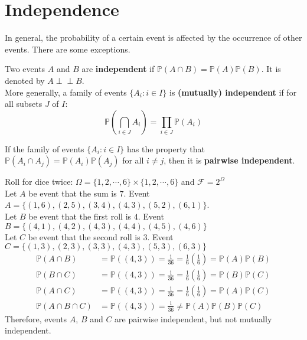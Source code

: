 \documentclass{huhtakm-template-book}
\newcommand{\independent}{\perp\!\!\!\perp}
\newcommand{\prob}{\mathbb{P}}
\begin{document}
\section{Independence}
    In general, the probability of a certain event is affected by the occurrence of other events. There are some exceptions.
    \begin{defn} %
        Two events $A$ and $B$ are \textbf{independent} if $\prob(A\cap B)=\prob(A)\prob(B)$. It is denoted by $A\independent B$.\\
        More generally, a family of events $\{A_{i}:i\in I\}$ is \textbf{(mutually) independent} if for all subsets $J$ of $I$:
        \begin{equation*}
            \prob\left(\bigcap_{i\in J}A_{i}\right)=\prod_{i\in J}\prob(A_{i})
        \end{equation*}
    \end{defn}
    \begin{rem}
        If the family of events $\{A_{i}:i\in I\}$ has the property that $\prob(A_{i}\cap A_{j})=\prob(A_{i})\prob(A_{j})$ for all $i\neq j$, then it is \textbf{pairwise independent}.
    \end{rem}
    \begin{eg}
        Roll for dice twice: $\Omega=\{1,2,\cdots,6\}\times\{1,2,\cdots,6\}$ and $\mathcal{F}=2^{\Omega}$\\
        Let $A$ be event that the sum is $7$. Event $A=\{(1,6),(2,5),(3,4),(4,3),(5,2),(6,1)\}$.\\
        Let $B$ be event that the first roll is $4$. Event $B=\{(4,1),(4,2),(4,3),(4,4),(4,5),(4,6)\}$\\
        Let $C$ be event that the second roll is $3$. Event $C=\{(1,3),(2,3),(3,3),(4,3),(5,3),(6,3)\}$
        \begin{align*}
            \prob(A\cap B)&=\prob((4,3))=\frac{1}{36}=\frac{1}{6}\left(\frac{1}{6}\right)=\prob(A)\prob(B)\\
            \prob(B\cap C)&=\prob((4,3))=\frac{1}{36}=\frac{1}{6}\left(\frac{1}{6}\right)=\prob(B)\prob(C)\\
            \prob(A\cap C)&=\prob((4,3))=\frac{1}{36}=\frac{1}{6}\left(\frac{1}{6}\right)=\prob(A)\prob(C)\\
            \prob(A\cap B\cap C)&=\prob((4,3))=\frac{1}{36}\neq\prob(A)\prob(B)\prob(C)
        \end{align*}
        Therefore, events $A$, $B$ and $C$ are pairwise independent, but not mutually independent.
    \end{eg}
\end{document}
